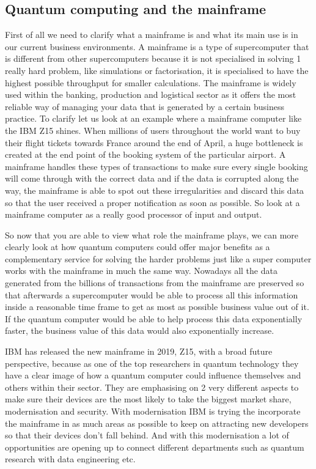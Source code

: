 \subsection{Quantum computing and the mainframe}

First of all we need to clarify what a mainframe is and what its main use is in our current business environments. A mainframe is a type of supercomputer that is different from other supercomputers because it is not specialised in solving 1 really hard problem, like simulations or factorisation, it is specialised to have the highest possible throughput for smaller calculations. The mainframe is widely used within the banking, production and logistical sector as it offers the most reliable way of managing your data that is generated by a certain business practice. To clarify let us look at an example where a mainframe computer like the IBM Z15 shines. When millions of users throughout the world want to buy their flight tickets towards France around the end of April, a huge bottleneck is created at the end point of the booking system of the particular airport. A mainframe handles these types of transactions to make sure every single booking will come through with the correct data and if the data is corrupted along the way, the mainframe is able to spot out these irregularities and discard this data so that the user received a proper notification as soon as possible. So look at a mainframe computer as a really good processor of input and output.

So now that you are able to view what role the mainframe plays, we can more clearly look at how quantum computers could offer major benefits as a complementary service for solving the harder problems just like a super computer works with the mainframe in much the same way. Nowadays all the data generated from the billions of transactions from the mainframe are preserved so that afterwards a supercomputer would be able to process all this information inside a reasonable time frame to get as most as possible business value out of it. If the quantum computer would be able to help process this data exponentially faster, the business value of this data would also exponentially increase.

IBM has released the new mainframe in 2019, Z15, with a broad future perspective, because as one of the top researchers in quantum technology they have a clear image of how a quantum computer could influence themselves and others within their sector.
They are emphasising on 2 very different aspects to make sure their devices are the most likely to take the biggest market share, modernisation and security. 
With modernisation IBM is trying the incorporate the mainframe in as much areas as possible to keep on attracting new developers so that their devices don't fall behind. And with this modernisation a lot of opportunities are opening up to connect different departments such as quantum research with data engineering etc. 

